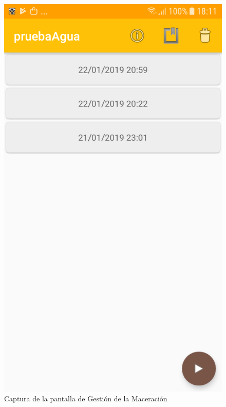                 \begin{figure}[h]
                    \centering
                    \includegraphics[scale=0.2]{software/ScreenCapture/ExperimentActivity.jpg}
                    \caption{Captura de la pantalla de Gestión de la Maceración}
                    \label{fig:CapturaExperimentAct}
                \end{figure}
